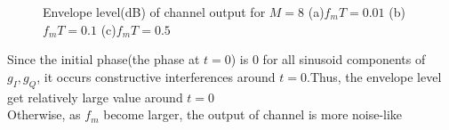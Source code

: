 \documentclass{article}
\begin{document}
\begin{flushleft}
\begin{enumerate}
\newpage
\begin{figure}[H]
\centering
{}
\caption{Envelope level(dB) of channel output for $M=8$ (a)$f_mT=0.01$ (b)$f_mT=0.1$ (c)$f_mT=0.5$}
\end{figure}
Since the initial phase(the phase at $t=0$) is 0 for all sinusoid components of $g_I,g_Q$, it occurs constructive interferences around $t=0$.Thus, the envelope level get relatively large value around $t=0$\\
Otherwise, as $f_m$ become larger, the output of channel is more noise-like



\end{enumerate}
\end{flushleft}
\end{document}
